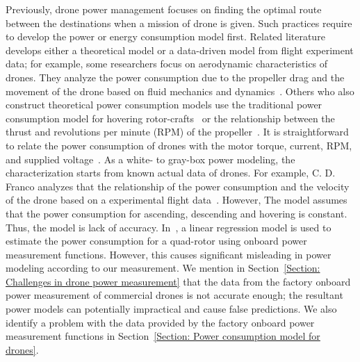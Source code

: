 \documentclass[journal]{./template/IEEEtran}
\begin{document}
Previously, drone power management focuses on finding the optimal route between the destinations when a mission of drone is given.
Such practices require to develop the power or energy consumption model first. 
Related literature develops either a theoretical model or a data-driven model from flight experiment data; for example, some researchers focus on aerodynamic characteristics of drones.
They analyze the power consumption due to the propeller drag and the movement of the drone based on fluid mechanics and dynamics~\cite{ref_3}. 
Others who also construct theoretical power consumption models use the traditional power consumption model for hovering rotor-crafts~\cite{ref_4} 
or the relationship between the thrust and revolutions per minute (RPM) of the propeller~\cite{ref_5}. 
It is straightforward to relate the power consumption of drones with the motor torque, current, RPM, and supplied voltage~\cite{ref_6,ref_7}. 
As a white- to gray-box power modeling, the characterization starts from known actual data of drones. For example, C. D. Franco analyzes that the relationship of the power consumption and the velocity of the drone based on a experimental flight data~\cite{ref_8}.  
However, The model assumes that the power consumption for ascending, descending and hovering is constant. Thus, the model is lack of accuracy.
In~\cite{ref_9}, a linear regression model is used to estimate the power consumption for a quad-rotor using onboard power measurement functions. 
However, this causes significant misleading in power modeling according to our measurement.
We mention in Section~\ref{Section: Challenges in drone power measurement} that the data from the factory onboard power measurement of commercial drones is not accurate enough; the resultant power models can potentially impractical and cause false predictions.
We also identify a problem with the data provided by the factory onboard power measurement functions in Section~\ref{Section: Power consumption model for drones}.
\end{document}
